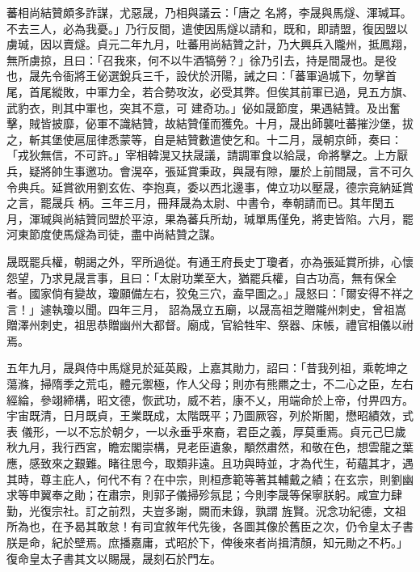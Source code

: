 \begin{pinyinscope}
 蕃相尚結贊頗多詐謀，尤惡晟，乃相與議云：「唐之
 名將，李晟與馬燧、渾瑊耳。不去三人，必為我憂。」乃行反間，遣使因馬燧以請和，既和，即請盟，復因盟以虜瑊，因以賣燧。貞元二年九月，吐蕃用尚結贊之計，乃大興兵入隴州，抵鳳翔，無所虜掠，且曰：「召我來，何不以牛酒犒勞？」徐乃引去，持是間晟也。是役也，晟先令衙將王佖選銳兵三千，設伏於汧陽，誡之曰：「蕃軍過城下，勿擊首尾，首尾縱敗，中軍力全，若合勢攻汝，必受其弊。但俟其前軍已過，見五方旗、武豹衣，則其中軍也，突其不意，可
 建奇功。」佖如晟節度，果遇結贊。及出奮擊，賊皆披靡，佖軍不識結贊，故結贊僅而獲免。十月，晟出師襲吐蕃摧沙堡，拔之，斬其堡使扈屈律悉蒙等，自是結贊數遣使乞和。十二月，晟朝京師，奏曰：「戎狄無信，不可許。」宰相韓滉又扶晟議，請調軍食以給晟，命將擊之。上方厭兵，疑將帥生事邀功。會滉卒，張延賞秉政，與晟有隙，屢於上前間晟，言不可久令典兵。延賞欲用劉玄佐、李抱真，委以西北邊事，俾立功以壓晟，德宗竟納延賞之言，罷晟兵
 柄。三年三月，冊拜晟為太尉、中書令，奉朝請而已。其年閏五月，渾瑊與尚結贊同盟於平涼，果為蕃兵所劫，瑊單馬僅免，將吏皆陷。六月，罷河東節度使馬燧為司徒，盡中尚結贊之謀。



 晟既罷兵權，朝謁之外，罕所過從。有通王府長史丁瓊者，亦為張延賞所排，心懷怨望，乃求見晟言事，且曰：「太尉功業至大，猶罷兵權，自古功高，無有保全者。國家倘有變故，瓊願備左右，狡兔三穴，盍早圖之。」晟怒曰：「爾安得不祥之言！」遽執瓊以聞。四年三月，
 詔為晟立五廟，以晟高祖芝贈隴州刺史，曾祖嵩贈澤州刺史，祖思恭贈幽州大都督。廟成，官給牲牢、祭器、床帳，禮官相儀以祔焉。



 五年九月，晟與侍中馬燧見於延英殿，上嘉其勛力，詔曰：「昔我列祖，乘乾坤之蕩滌，掃隋季之荒屯，體元禦極，作人父母；則亦有熊羆之士，不二心之臣，左右經綸，參翊締構，昭文德，恢武功，威不若，康不乂，用端命於上帝，付畀四方。宇宙既清，日月既貞，王業既成，太階既平；乃圖厥容，列於斯閣，懋昭績效，式表
 儀形，一以不忘於朝夕，一以永垂乎來裔，君臣之義，厚莫重焉。貞元己巳歲秋九月，我行西宮，瞻宏閣崇構，見老臣遺象，顒然肅然，和敬在色，想雲龍之葉應，感致來之艱難。睹往思今，取類非遠。且功與時並，才為代生，茍蘊其才，遇其時，尊主庇人，何代不有？在中宗，則桓彥範等著其輔戴之績；在玄宗，則劉幽求等申翼奉之勛；在肅宗，則郭子儀掃殄氛昆；今則李晟等保寧朕躬。咸宣力肆勤，光復宗社。訂之前烈，夫豈多謝，闕而未錄，孰謂
 旌賢。況念功紀德，文祖所為也，在予曷其敢怠！有司宜敘年代先後，各圖其像於舊臣之次，仍令皇太子書朕是命，紀於壁焉。庶播嘉庸，式昭於下，俾後來者尚揖清顏，知元勛之不朽。」復命皇太子書其文以賜晟，晟刻石於門左。




\end{pinyinscope}
